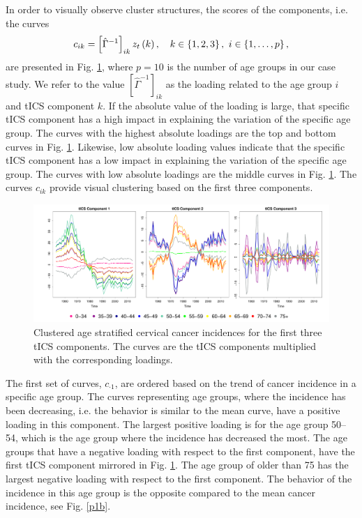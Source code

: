 \documentclass{llncs}
\begin{document}
In order to visually observe cluster structures,  the scores of the components, i.e. the curves 
\begin{align*}
c_{ik} = \left[\hat{\Gamma}^{-1}\right]_{ik}z_t\left(k\right), \quad k\in\left\{1,2,3\right\}, \textnormal{ } i \in \left\{1,\ldots, p\right\},
\end{align*}
are presented in Fig. \ref{fig:cluster}, where $p=10$ is the number of age groups in our case study. We refer to the value $\left[\hat{\Gamma}^{-1}\right]_{ik}$ as the loading related to the age group $i$ and tICS component $k$. If the absolute value of the loading is large, that specific tICS component has a high impact in explaining the variation of the specific age group. The curves with the highest absolute loadings are the top and bottom curves in Fig. \ref{fig:cluster}. Likewise, low absolute loading values indicate that the specific tICS component has a low impact in explaining the variation of the specific age group. The curves with low absolute loadings are the middle curves in Fig. \ref{fig:cluster}.    The curves $c_{ik}$ provide visual clustering based on the first three components. 


\begin{figure}
     \centering
  \includegraphics[width=1\linewidth]{clusteri.pdf}
     \caption{Clustered age stratified cervical cancer incidences for the first three tICS components. The curves are the tICS components multiplied with the corresponding loadings.}
     \label{fig:cluster}
\end{figure}



The first set of curves, $c_{\cdot 1}$, are ordered based on the trend of  cancer incidence in a specific age group. The curves representing age groups, where the incidence has been decreasing, i.e. the behavior is similar to the mean curve, have a positive loading in this component.  The largest positive loading is for the age group 50--54, which is the age group where the incidence has decreased the most. The age groups that have a negative loading with respect to the first component, have the first tICS component mirrored in Fig. \ref{fig:cluster}. The age group of  older than 75 has the largest negative loading with respect to the first component. The behavior of the incidence in this age group is the opposite compared to the mean cancer incidence, see Fig. \ref{p1b}.
\end{document}
